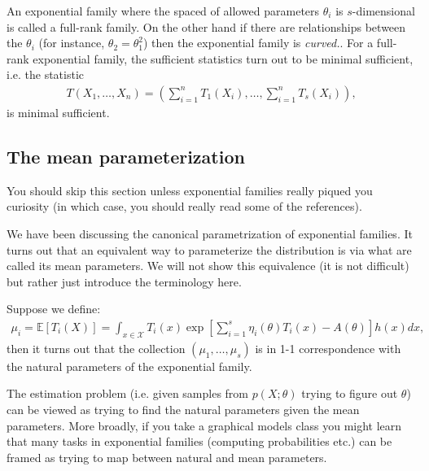\documentclass[twoside,12pt]{article}
\begin{document}
An exponential family where the spaced of allowed parameters $\theta_i$ is $s$-dimensional is called a full-rank family. On the other hand if there are relationships between the $\theta_i$ (for instance, $\theta_2 = \theta_1^2$) then the exponential family is \emph{curved.}.
For a full-rank exponential family, the sufficient statistics turn out to be minimal sufficient, i.e. the statistic \begin{align*}
T(X_1,\ldots,X_n) = \left(\sum_{i=1}^n T_1(X_i), \ldots, \sum_{i=1}^n T_s(X_i) \right),
\end{align*}
is minimal sufficient. 

\subsection{The mean parameterization}
You should skip this section unless exponential families really piqued you curiosity (in which case, you should really read some of the references).

We have been discussing the canonical parametrization of exponential families. It turns out that an equivalent way to parameterize the distribution is via what are called its mean parameters. We will not show this equivalence (it is not difficult) but rather just introduce the terminology here.

Suppose we define:
\begin{align*}
\mu_i = \mathbb{E} [ T_i(X) ] = \int_{x \in \mathcal{X}} T_i(x)  \exp \left[ \sum_{i=1}^s \eta_i(\theta) T_i(x) - A(\theta)\right] h(x) dx, 
\end{align*}
then it turns out that the collection $(\mu_1,\ldots,\mu_s)$ is in 1-1 correspondence with the natural parameters of the exponential family.

The estimation problem (i.e. given samples from $p(X; \theta)$ trying to figure out $\theta$) can be viewed as trying to find the natural parameters given the mean parameters. More broadly, if you take a graphical models class you might learn that many tasks in exponential families (computing probabilities etc.) can be framed as trying to map between natural and mean parameters.
\end{document}
